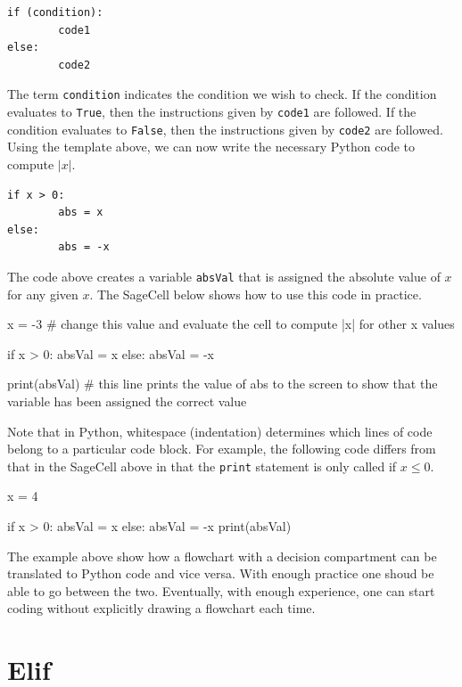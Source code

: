 \documentclass{ximera}
\begin{document}
\begin{verbatim}
if (condition):
        code1
else:
        code2
\end{verbatim}

The term \verb|condition| indicates the condition we wish to check. If the condition evaluates to \verb|True|, then the instructions given by \verb|code1| are followed. If the condition evaluates to \verb|False|, then the instructions given by \verb|code2| are followed. Using the template above, we can now write the necessary Python code to compute $|x|$.

\begin{verbatim}
if x > 0:
        abs = x
else:
        abs = -x
\end{verbatim}

The code above creates a variable \verb|absVal| that is assigned the absolute value of $x$ for any given $x$. The SageCell below shows how to use this code in practice.

\begin{sageCell}
x = -3            # change this value and evaluate the cell to compute |x| for other x values

if x > 0:
	absVal = x
else:
	absVal = -x

print(absVal)        # this line prints the value of abs to the screen to show that the variable has been assigned the correct value
\end{sageCell}

Note that in Python, whitespace (indentation) determines which lines of code belong to a particular code block. For example, the following code differs from that in the SageCell above in that the \verb|print| statement is only called if $x\leq 0$.

\begin{sageCell}
x = 4

if x > 0:
	absVal = x
else:
	absVal = -x
	print(absVal)
\end{sageCell}

The example above show how a flowchart with a decision compartment can be translated to Python code and vice versa. With enough practice one shoud be able to go between the two. Eventually, with enough experience, one can start coding without explicitly drawing a flowchart each time.

\section{Elif}
\end{document}
